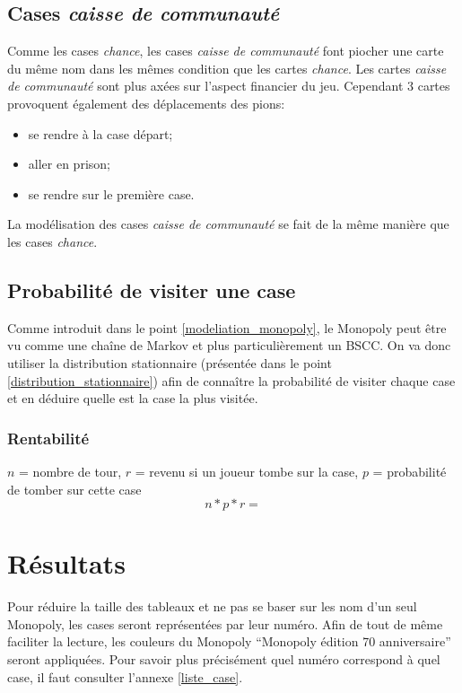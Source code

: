 \documentclass[letterpaper]{article}
\begin{document}
  \subsection{Cases \textit{caisse de communauté}}
    Comme les cases \textit{chance}, les cases \textit{caisse de 
    communauté} font piocher une carte du même nom dans les mêmes
    condition que les cartes \textit{chance}.  Les cartes 
    \textit{caisse de communauté} sont plus axées sur l'aspect 
    financier du jeu. Cependant 3 cartes provoquent également des 
    déplacements des pions:
    \begin{itemize}
     \item se rendre à la case départ;
     \item aller en prison;
     \item se rendre sur le première case.
    \end{itemize}
    La modélisation des cases \textit{caisse de communauté} se fait de la 
    même manière que les cases \textit{chance}.
    
  \subsection{Probabilité de visiter une case}
    Comme introduit dans le point \ref{modeliation_monopoly}, le Monopoly
    peut être vu comme une chaîne de Markov et plus particulièrement un
    BSCC.  On va donc utiliser la distribution stationnaire (présentée dans
    le point \ref{distribution_stationnaire}) afin de connaître la
    probabilité de visiter chaque case et en déduire quelle est la case la
    plus visitée.
    
  \subsubsection{Rentabilité}
    $n$ = nombre de tour, $r$ = revenu si un joueur tombe sur la case, 
    $p$ = probabilité de tomber sur cette case
    $$n * p * r = $$
    
    
\section{Résultats}
  Pour réduire la taille des tableaux et ne pas se baser sur les nom d'un seul
  Monopoly, les cases seront représentées par leur numéro.  Afin de tout de même 
  faciliter la lecture, les couleurs du Monopoly ``Monopoly édition 70 
  anniversaire'' seront appliquées.  Pour savoir plus précisément quel numéro
  correspond à quel case, il faut consulter l'annexe \ref{liste_case}.
  
\end{document}
